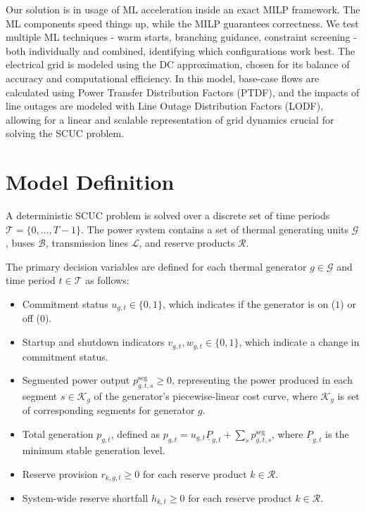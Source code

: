 \documentclass{ieeeaccess}
\begin{document}
Our solution is in usage of ML acceleration inside an exact MILP framework. The ML components speed things up, while the MILP guarantees correctness. We test multiple ML techniques - warm starts, branching guidance, constraint screening - both individually and combined, identifying which configurations work best. The electrical grid is modeled using the DC approximation, chosen for its balance of accuracy and computational efficiency. In this model, base-case flows are calculated using Power Transfer Distribution Factors (PTDF), and the impacts of line outages are modeled with Line Outage Distribution Factors (LODF), allowing for a linear and scalable representation of grid dynamics crucial for solving the SCUC problem.

\section{Model Definition}

A deterministic SCUC problem is solved over a discrete set of time periods $\mathcal{T}=\{0,\dots,T-1\}$. The power system contains a set of thermal generating units $\mathcal{G}$, buses $\mathcal{B}$, transmission lines $\mathcal{L}$, and reserve products $\mathcal{R}$.

The primary decision variables are defined for each thermal generator $g\in\mathcal{G}$ and time period $t\in\mathcal{T}$ as follows:
\begin{itemize}
    \item Commitment status $u_{g,t}\in\{0,1\}$, which indicates if the generator is on ($1$) or off ($0$).
    \item Startup and shutdown indicators $v_{g,t}, w_{g,t}\in\{0,1\}$, which indicate a change in commitment status.
    \item Segmented power output $p^{\mathrm{seg}}_{g,t,s}\ge 0$, representing the power produced in each segment $s \in \mathcal{K}_g$ of the generator's piecewise-linear cost curve, where $\mathcal{K}_g$ is set of corresponding segments for generator $g$.
    \item Total generation $p_{g,t}$, defined as $p_{g,t}=u_{g,t}\underline{P}_{g,t}+\sum_{s}p^{\mathrm{seg}}_{g,t,s}$, where $\underline{P}_{g,t}$ is the minimum stable generation level.
    \item Reserve provision $r_{k,g,t}\ge 0$ for each reserve product $k\in\mathcal{R}$.
    \item System-wide reserve shortfall $h_{k,t}\ge 0$ for each reserve product $k\in\mathcal{R}$.
\end{itemize}
\end{document}
